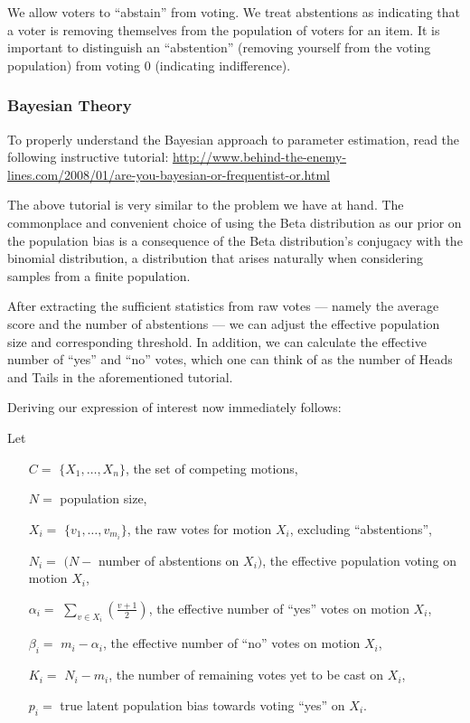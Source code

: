 \documentclass{sigchi}
\begin{document}
We allow voters to ``abstain'' from voting.
We treat abstentions as indicating that a voter is removing themselves from the population of voters for an item.
It is important to distinguish an ``abstention'' (removing yourself from the voting population) from voting $0$
(indicating indifference).

\subsubsection{Bayesian Theory}
To properly understand the Bayesian approach to parameter estimation, read the following instructive tutorial:
\url{http://www.behind-the-enemy-lines.com/2008/01/are-you-bayesian-or-frequentist-or.html}

The above tutorial is very similar to the problem we have at hand.
The commonplace and convenient choice of using the Beta distribution as our prior on the population bias is a
consequence of the Beta distribution's conjugacy with the binomial distribution, a distribution that arises
naturally when considering samples from a finite population.

After extracting the sufficient statistics from raw votes --- namely the average score and the number of
abstentions --- we can adjust the effective population size and corresponding threshold.
In addition, we can calculate the effective number of ``yes'' and ``no'' votes, which one can think of as the number
of Heads and Tails in the aforementioned tutorial.

Deriving our expression of interest now immediately follows:

Let
\begin{description}
\begin{itemize}
\item[$C = $] $\{X_1,\ldots, X_n\}$, the set of competing motions,
\item[$N = $] population size,
\item[$X_i = $] $\{v_1, \ldots, v_{m_i}\}$, the raw votes for motion $X_i$, excluding ``abstentions'',
\item[$N_i = $] $(N - $ number of abstentions on $X_i)$, the effective population voting on motion $X_i$,
\item[$\alpha_i = $] $\sum\limits_{v \in X_i} (\frac{v+1}{2})$, the effective number of ``yes'' votes on motion $X_i$,
\item[$\beta_i = $] $m_i - \alpha_i$, the effective number of ``no'' votes on motion $X_i$,
\item[$K_i = $] $N_i - m_i$, the number of remaining votes yet to be cast on $X_i$,
\item[$p_i = $] true latent population bias towards voting ``yes'' on $X_i$.
\end{itemize}
\end{description}
\end{document}
